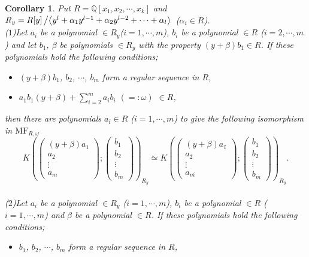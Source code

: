 \documentclass[10pt]{amsart}
\theoremstyle{break}
\newtheorem{cor}[de]{Corollary}
\begin{document}
\begin{cor}\label{induce-sq1}
Put $R={{\mathbb{Q}}}[x_1,x_2,\cdots ,x_k]$ and $R_y=R[y]\left/\left<y^l+\alpha_1y^{l-1} +\alpha_2y^{l-2} +\cdots +\alpha_l\right>\right.$ ($\alpha_i\in R$).\\
($1$)Let $a_i$ be a polynomial $\in R_y$($i=1,\cdots ,m$), $b_i$ be a polynomial $\in R$ ($i=2,\cdots ,m$) and let $b_1$, $\beta$ be polynomials $\in R_y$ with the property $(y+\beta)b_1\in R$.
If these polynomials hold the following conditions;
\begin{itemize}
\item[(i)]$(y+\beta)b_1$, $b_2$, $\cdots$, $b_m$ form a regular sequence in $R$,
\item[(ii)] $\displaystyle a_1b_1(y+\beta)+\sum_{i=2}^m a_ib_i$ $(=:\omega)$ $\in R$,
\end{itemize}
then there are polynomials $a_i\acute{} \in R$ ($i=1,\cdots ,m$) to give the following isomorphism in ${{\mathrm{MF}}}_{R,\omega}$
\begin{equation*}
K\left(\left(
\begin{array}{c}
(y+\beta)a_1\\
a_2\\
\vdots\\
a_m
\end{array}
\right);
\left(
\begin{array}{c}
b_1\\
b_2\\
\vdots\\
b_m
\end{array}
\right)\right)_{R_y}
\simeq
K\left(\left(
\begin{array}{c}
(y+\beta)a_1\acute{}\\
a_2\acute{}\\
\vdots\\
a_m\acute{}
\end{array}
\right);
\left(
\begin{array}{c}
b_1\\
b_2\\
\vdots\\
b_m
\end{array}
\right)\right)_{R_y}.
\end{equation*}
\\
\noindent
($2$)Let $a_i$ be a polynomial $\in R_y$ ($i=1,\cdots ,m$), $b_i$ be a polynomial $\in R$ ($i=1,\cdots ,m$) and $\beta$ be a polynomial $\in R$.
If these polynomials hold the following conditions;
\begin{itemize}
\item[(i)]$b_1$, $b_2$, $\cdots$, $b_m$ form a regular sequence in $R$,

\end{itemize}
\end{cor}
\end{document}
